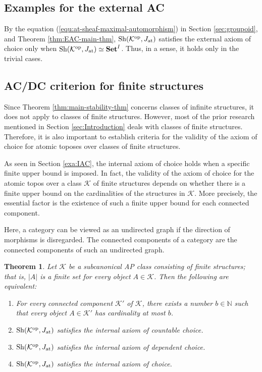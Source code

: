 \documentclass[10pt]{amsart}
\numberwithin{equation}{section}
\theoremstyle{plain}
\newtheorem{theorem}{Theorem}[section]
\theoremstyle{definition}
\newcommand{\N}{\mathbb{N}}
\newcommand{\K}{\mathcal{K}}
\begin{document}
\subsection{Examples for the external AC}

By the equation (\ref{equ:at-sheaf-maximal-automorphism}) in Section \ref{sec:groupoid}, and Theorem \ref{thm:EAC-main-thm}, ${\rm Sh}(\K^{\rm op},J_{\rm at})$ satisfies the external axiom of choice only when ${\rm Sh}(\K^{\rm op},J_{\rm at})\simeq{\bf Set}^I$.
Thus, in a sense, it holds only in the trivial cases.

\subsection{AC/DC criterion for finite structures}

Since Theorem \ref{thm:main-stability-thm} concerns classes of infinite structures, it does not apply to classes of finite structures.
However, most of the prior research mentioned in Section \ref{sec:Introduction} deals with classes of finite structures.
Therefore, it is also important to establish criteria for the validity of the axiom of choice for atomic toposes over classes of finite structures.


As seen in Section \ref{exa:IAC}, the internal axiom of choice holds when a specific finite upper bound is imposed.
In fact, the validity of the axiom of choice for the atomic topos over a class $\K$ of finite structures depends on whether there is a finite upper bound on the cardinalities of the structures in $\K$.
More precisely, the essential factor is the existence of such a finite upper bound for each connected component.

Here, a category can be viewed as an undirected graph if the direction of morphisms is disregarded.
The connected components of a category are the connected components of such an undirected graph.


\begin{theorem}\label{thm:main-finite-structures}
Let $\K$ be a subcanonical AP class consisting of finite structures; that is, $|A|$ is a finite set for every object $A\in\K$.
Then the following are equivalent:
\begin{enumerate}
\item For every connected component $\K'$ of $\K$, there exists a number $b\in\N$ such that every object $A\in \K'$ has cardinality at most $b$.
\item ${\rm Sh}(\K^{\rm op},J_{\rm at})$ satisfies the internal axiom of countable choice.
\item ${\rm Sh}(\K^{\rm op},J_{\rm at})$ satisfies the internal axiom of dependent choice.
\item ${\rm Sh}(\K^{\rm op},J_{\rm at})$ satisfies the internal axiom of choice.
\end{enumerate}
\end{theorem}
\end{document}
